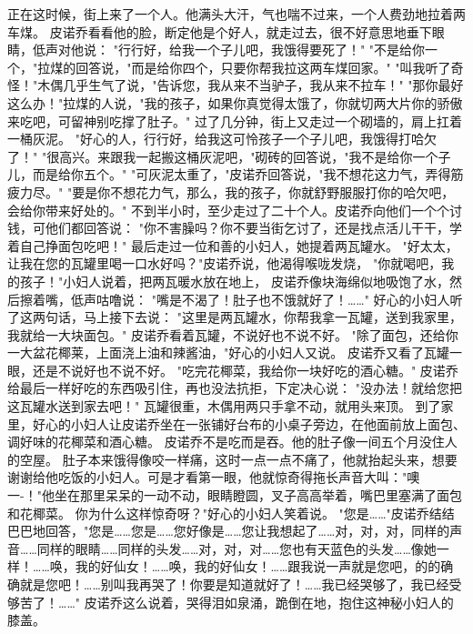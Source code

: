 \documentclass[12pt,UTF8]{ctexbook}
\begin{document}
正在这时候，街上来了一个人。他满头大汗，气也喘不过来，一个人费劲地拉着两车煤。
皮诺乔看看他的脸，断定他是个好人，就走过去，很不好意思地垂下眼睛，低声对他说：
"行行好，给我一个子儿吧，我饿得要死了！"
"不是给你一个，"拉煤的回答说，"而是给你四个，只要你帮我拉这两车煤回家。"
"叫我听了奇怪！"木偶几乎生气了说，"告诉您，我从来不当驴子，我从来不拉车！"
"那你最好这么办！"拉煤的人说，"我的孩子，如果你真觉得太饿了，你就切两大片你的骄傲来吃吧，可留神别吃撑了肚子。"
过了几分钟，街上又走过一个砌墙的，肩上扛着一桶灰泥。
"好心的人，行行好，给我这可怜孩子一个子儿吧，我饿得打哈欠了！"
"很高兴。来跟我一起搬这桶灰泥吧，"砌砖的回答说，"我不是给你一个子儿，而是给你五个。"
"可灰泥太重了，"皮诺乔回答说，"我不想花这力气，弄得筋疲力尽。"
"要是你不想花力气，那么，我的孩子，你就舒野服服打你的哈欠吧，会给你带来好处的。"
不到半小时，至少走过了二十个人。皮诺乔向他们一个个讨钱，可他们都回答说：
"你不害臊吗？你不要当街乞讨了，还是找点活儿干干，学着自己挣面包吃吧！"
最后走过一位和善的小妇人，她提着两瓦罐水。
"好太太，让我在您的瓦罐里喝一口水好吗？"皮诺乔说，他渴得喉咙发烧，
"你就喝吧，我的孩子！"小妇人说着，把两瓦暖水放在地上，
皮诺乔像块海绵似地吸饱了水，然后擦着嘴，低声咕噜说：
"嘴是不渴了！肚子也不饿就好了！……"
好心的小妇人听了这两句话，马上接下去说：
"这里是两瓦罐水，你帮我拿一瓦罐，送到我家里，我就给一大块面包。"
皮诺乔看着瓦罐，不说好也不说不好。
"除了面包，还给你一大盆花椰莱，上面浇上油和辣酱油，"好心的小妇人又说。
皮诺乔又看了瓦罐一眼，还是不说好也不说不好。
"吃完花椰菜，我给你一块好吃的酒心糖。"
皮诺乔给最后一样好吃的东西吸引住，再也没法抗拒，下定决心说：
"没办法！就给您把这瓦罐水送到家去吧！"
瓦罐很重，木偶用两只手拿不动，就用头来顶。
到了家里，好心的小妇人让皮诺乔坐在一张铺好台布的小桌子旁边，在他面前放上面包、调好味的花椰菜和酒心糖。
皮诺乔不是吃而是吞。他的肚子像一间五个月没住人的空屋。
肚子本来饿得像咬一样痛，这时一点一点不痛了，他就抬起头来，想要谢谢给他吃饭的小妇人。可是才看第一眼，他就惊奇得拖长声音大叫："噢一-！"他坐在那里呆呆的一动不动，眼睛瞪圆，叉子高高举着，嘴巴里塞满了面包和花椰菜。
你为什么这样惊奇呀？"好心的小妇人笑着说。
"您是……"皮诺乔结结巴巴地回答，"您是……您是……您好像是……您让我想起了……对，对，对，同样的声音……同样的眼睛……同样的头发……对，对，对……您也有天蓝色的头发……像她一样！……唤，我的好仙女！……唤，我的好仙女！……跟我说一声就是您吧，的的确确就是您吧！……别叫我再哭了！你要是知道就好了！……我已经哭够了，我已经受够苦了！……"
皮诺乔这么说着，哭得泪如泉涌，跪倒在地，抱住这神秘小妇人的膝盖。

\chapter{}
\end{document}
